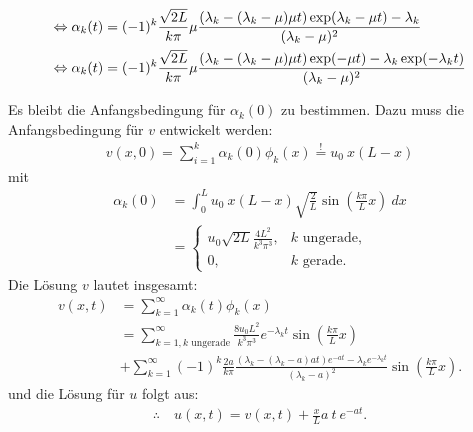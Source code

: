 \documentclass[12pt]{article}
\begin{document}
\begin{enumerate}
\begin{itemize}
\begin{align}
			            \Leftrightarrow \alpha_{k}(t)
			             & = (-1)^k \frac{\sqrt{2L}}{k \pi} \mu  
			            \frac{(\lambda_k - (\lambda_k-\mu)\mu t) \exp(\lambda_k -\mu t) - \lambda_k}
			            {(\lambda_k -\mu)^2}  \notag                                                                          \\
			            \Leftrightarrow \alpha_{k}(t)
			             & = (-1)^k \frac{\sqrt{2L}}{k \pi} \mu  
			            \frac{
				            (\lambda_k - (\lambda_k-\mu)\mu t) \exp(-\mu t)
				            - \lambda_k \exp(-\lambda_k t)}
			            {(\lambda_k -\mu)^2}
		            \end{align}
	      \end{itemize}
\end{enumerate}

Es bleibt die Anfangsbedingung für $\alpha_k(0)$ zu bestimmen.
Dazu muss die Anfangsbedingung für $v$ entwickelt werden:
\begin{align*}
	v(x,0) = \sum_{i=1}^k \alpha_k(0) \phi_k(x) \overset{!}{=} u_0\ x(L-x)
\end{align*}
mit
\begin{align*}
	\alpha_k(0)
	 & = \int_0^L u_0\ x (L-x) \sqrt{\frac{2}{L}} \sin\left( \frac{k \pi}{L} x \right) \ dx \\
	 & =
	\begin{cases}
		\displaystyle
		u_0 \sqrt{2L} \frac{4 L^2}{k^3 \pi^3}, & k \text{ ungerade}, \\
		0,                                     & k\text{ gerade}.
	\end{cases}
\end{align*}
Die Lösung $v$ lautet insgesamt:
\begin{align*}
	v(x,t) & = \sum_{k=1}^\infty \alpha_k(t) \phi_k(x)                                                                                                                                         \\
	       & = \sum_{k=1,k \text{ ungerade}}^\infty \frac{8 u_0 L^2}{k^3 \pi^3} e^{-\lambda_k t} \sin\left( \frac{k \pi}{L} x \right)                                                          \\
	       & + \sum_{k=1}^\infty (-1)^k \frac{2a}{k \pi}   \frac{(\lambda_k - (\lambda_k-a)a t)e^{-a t} - \lambda_k e^{-\lambda_k t}}{(\lambda_k - a)^2} \sin\left( \frac{k \pi}{L} x \right).
\end{align*}
und die Lösung für $u$ folgt aus:
\begin{align*}
	\therefore\quad\boxed{
		u(x,t) = v(x,t) + \frac{x}{L} a\ t\ e^{-a t}.
	}
\end{align*}
\end{document}
